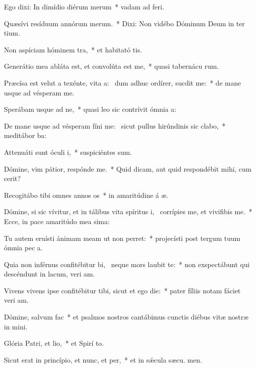 \item Ego dixi: In dimídio diérum merum~* vadam ad  feri.
\item Quæsívi resíduum annórum merum.~* Dixi: Non vidébo Dóminum Deum in ter tium.
\item Non aspíciam hóminem tra,~* et habitató tis.
\item Generátio mea abláta est, et convolúta est  me,~* quasi tabernácu rum.
\item Præcísa est velut a texénte, vita a:~\pscross{} dum adhuc ordírer, sucdit me:~* de mane usque ad vésperam  me.
\item Sperábam usque ad ne,~* quasi leo sic contrívit ómnia  a:
\item De mane usque ad vésperam fíni me:~\pscross{} sicut pullus hirúndinis sic clabo,~* meditábor  ba:
\item Attenuáti sunt óculi i,~* suspiciéntes  sum.
\item Dómine, vim pátior, respónde  me.~* Quid dicam, aut quid respondébit mihi, cum  cerit?
\item Recogitábo tibi omnes annos os~* in amaritúdine á æ.
\item Dómine, si sic vívitur, et in tálibus vita spíritus i,~\pscross{} corrípies me, et vivifibis me.~* Ecce, in pace amaritúdo mea sima:
\item Tu autem eruísti ánimam meam ut non perret:~* projecísti post tergum tuum ómnia pec a.
\item Quia non inférnus confitébitur bi,~\pscross{} neque mors laubit te:~* non exspectábunt qui descéndunt in lacum, veri am.
\item Vivens vivens ipse confitébitur tibi, sicut et ego die:~* pater fíliis notam fáciet veri am.
\item Dómine, salvum  fac~* et psalmos nostros cantábimus cunctis diébus vitæ nostræ in  mini.
\item Glória Patri, et lio,~* et Spirí to.
\item Sicut erat in princípio, et nunc, et per,~* et in sǽcula sæcu. men.
